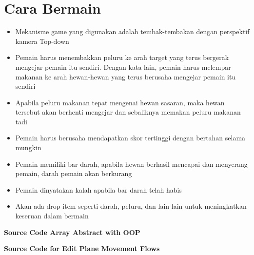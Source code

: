 \documentclass[11pt]{article} %
\begin{document}
	\section{Cara Bermain}
		\begin{itemize}
			\item Mekanisme game yang digunakan adalah tembak-tembakan dengan perspektif kamera Top-down
		
			\item Pemain harus menembakkan peluru ke arah target yang terus bergerak mengejar pemain itu sendiri. Dengan kata lain, pemain harus melempar makanan ke arah hewan-hewan yang terus berusaha mengejar pemain itu sendiri
		
			\item Apabila peluru makanan tepat mengenai hewan sasaran, maka hewan tersebut akan berhenti mengejar dan sebaliknya memakan peluru makanan tadi
		
			\item Pemain harus berusaha mendapatkan skor tertinggi dengan bertahan selama mungkin
		
			\item Pemain memiliki bar darah, apabila hewan berhasil mencapai dan menyerang pemain, darah pemain akan berkurang
		
			\item Pemain dinyatakan kalah apabila bar darah telah habis
		
			\item Akan ada drop item seperti darah, peluru, dan lain-lain untuk meningkatkan keseruan dalam bermain
		\end{itemize}
	
	\newpage
	\begin{center}
		\textbf{Source Code Array Abstract with OOP}
	\end{center}
	
	
	\newpage
	\begin{center}
		\textbf{Source Code for Edit Plane Movement Flows}
	\end{center}
	
	
\end{document}
